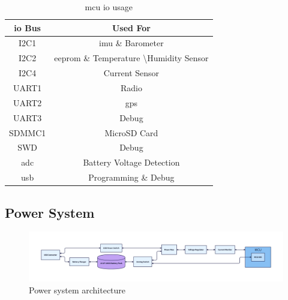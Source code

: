 \begin{table}[H]
    \centering
    \begin{tabular}{cc}
        \toprule
        \textbf{\gls{io} Bus} & \textbf{Used For}                                          \\
        \midrule
        I2C1                  & \gls{imu} \& Barometer                                     \\
        I2C2                  & \gls{eeprom} \& Temperature \textbackslash Humidity Sensor \\
        I2C4                  & Current Sensor                                             \\
        UART1                 & Radio                                                      \\
        UART2                 & \gls{gps}                                                  \\
        UART3                 & Debug                                                      \\
        SDMMC1                & MicroSD Card                                               \\
        SWD                   & Debug                                                      \\
        \gls{adc}             & Battery Voltage Detection                                  \\
        \gls{usb}             & Programming \& Debug                                       \\
        \bottomrule
    \end{tabular}
    \caption{\gls{mcu} \gls{io} usage}
    \label{tab:mcu-io}
\end{table}

\subsection{Power System}

\begin{figure}[H]
    \centering
    \includegraphics[width=\linewidth]{assets/diagrams/power_system.png}
    \caption{Power system architecture}
    \label{fig:power-system}
\end{figure}

